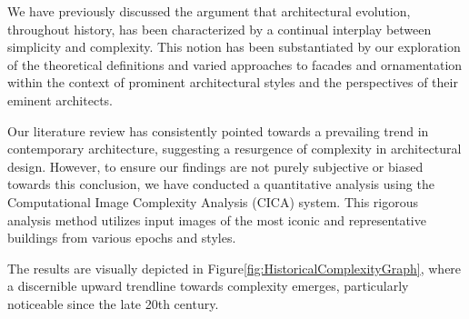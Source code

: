 %    


We have previously discussed the argument that architectural evolution, throughout history, has been characterized by a continual interplay between simplicity and complexity.
This notion has been substantiated by our exploration of the theoretical definitions and varied approaches to facades and ornamentation within the context of prominent architectural styles and the perspectives of their eminent architects.

Our literature review has consistently pointed towards a prevailing trend in contemporary architecture, suggesting a resurgence of complexity in architectural design.
However, to ensure our findings are not purely subjective or biased towards this conclusion, we have conducted a quantitative analysis using the Computational Image Complexity Analysis (CICA) system.
This rigorous analysis method utilizes input images of the most iconic and representative buildings from various epochs and styles.

The results are visually depicted in Figure\ref{fig:HistoricalComplexityGraph}, where a discernible upward trendline towards complexity emerges, particularly noticeable since the late 20th century.












